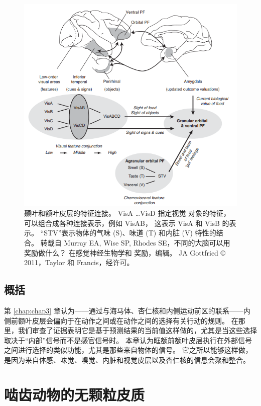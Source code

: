 \begin{figure}[!htb]
	\centering
	\includegraphics{image_pfc/Fig_4_3}
	\caption{颞叶和额叶皮层的特征连接。 VisA …VisD 指定视觉
		对象的特征，可以组合成各种连接表示，例如 VisAB，
		这表示 VisA 和 VisB 的表示。 “STV”表示物体的气味 (S)、味道 (T) 和内脏 (V) 特性的结合。 转载自 Murray EA, Wise SP,
		Rhodes SE，不同的大脑可以用奖励做什么？ 在感觉神经生物学和
		奖励，编辑。 JA Gottfried © 2011，Taylor 和 Francis，经许可。}\label{fig:fig_4_3}
\end{figure}



\subsection{概括}

第 \ref{chap:chap3} 章认为——通过与海马体、杏仁核和内侧运动前区的联系——内侧前额叶皮层会偏向于在动作之间或在动作之间的选择有关行动的规则。
在那里，我们审查了证据表明它是基于预测结果的当前值这样做的，尤其是当这些选择取决于“内部”信号而不是感官信号时。
本章认为眶额前额叶皮层执行在外部信号之间进行选择的类似功能，尤其是那些来自物体的信号。
它之所以能够这样做，是因为来自体感、味觉、嗅觉、内脏和视觉皮层以及杏仁核的信息会聚和整合。



\section{啮齿动物的无颗粒皮质}

